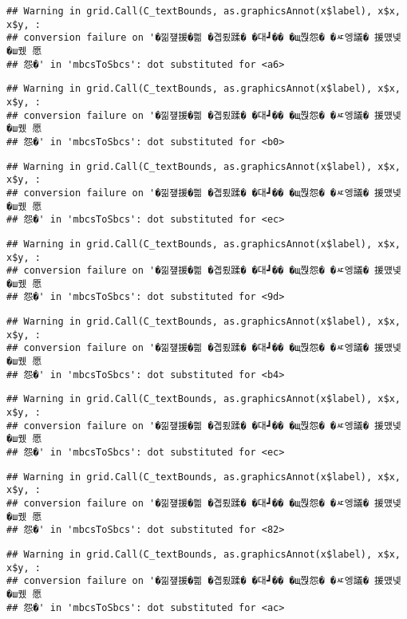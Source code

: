 \documentclass[
]{article}
\begin{document}
\begin{verbatim}
## Warning in grid.Call(C_textBounds, as.graphicsAnnot(x$label), x$x, x$y, :
## conversion failure on '�낆쟾援�쁾 �곕룄蹂� �대┛�� �щ쭩怨� �ㅼ엥議� 援먰넻�ш퀬 愿
## 怨�' in 'mbcsToSbcs': dot substituted for <a6>
\end{verbatim}

\begin{verbatim}
## Warning in grid.Call(C_textBounds, as.graphicsAnnot(x$label), x$x, x$y, :
## conversion failure on '�낆쟾援�쁾 �곕룄蹂� �대┛�� �щ쭩怨� �ㅼ엥議� 援먰넻�ш퀬 愿
## 怨�' in 'mbcsToSbcs': dot substituted for <b0>
\end{verbatim}

\begin{verbatim}
## Warning in grid.Call(C_textBounds, as.graphicsAnnot(x$label), x$x, x$y, :
## conversion failure on '�낆쟾援�쁾 �곕룄蹂� �대┛�� �щ쭩怨� �ㅼ엥議� 援먰넻�ш퀬 愿
## 怨�' in 'mbcsToSbcs': dot substituted for <ec>
\end{verbatim}

\begin{verbatim}
## Warning in grid.Call(C_textBounds, as.graphicsAnnot(x$label), x$x, x$y, :
## conversion failure on '�낆쟾援�쁾 �곕룄蹂� �대┛�� �щ쭩怨� �ㅼ엥議� 援먰넻�ш퀬 愿
## 怨�' in 'mbcsToSbcs': dot substituted for <9d>
\end{verbatim}

\begin{verbatim}
## Warning in grid.Call(C_textBounds, as.graphicsAnnot(x$label), x$x, x$y, :
## conversion failure on '�낆쟾援�쁾 �곕룄蹂� �대┛�� �щ쭩怨� �ㅼ엥議� 援먰넻�ш퀬 愿
## 怨�' in 'mbcsToSbcs': dot substituted for <b4>
\end{verbatim}

\begin{verbatim}
## Warning in grid.Call(C_textBounds, as.graphicsAnnot(x$label), x$x, x$y, :
## conversion failure on '�낆쟾援�쁾 �곕룄蹂� �대┛�� �щ쭩怨� �ㅼ엥議� 援먰넻�ш퀬 愿
## 怨�' in 'mbcsToSbcs': dot substituted for <ec>
\end{verbatim}

\begin{verbatim}
## Warning in grid.Call(C_textBounds, as.graphicsAnnot(x$label), x$x, x$y, :
## conversion failure on '�낆쟾援�쁾 �곕룄蹂� �대┛�� �щ쭩怨� �ㅼ엥議� 援먰넻�ш퀬 愿
## 怨�' in 'mbcsToSbcs': dot substituted for <82>
\end{verbatim}

\begin{verbatim}
## Warning in grid.Call(C_textBounds, as.graphicsAnnot(x$label), x$x, x$y, :
## conversion failure on '�낆쟾援�쁾 �곕룄蹂� �대┛�� �щ쭩怨� �ㅼ엥議� 援먰넻�ш퀬 愿
## 怨�' in 'mbcsToSbcs': dot substituted for <ac>
\end{verbatim}
\end{document}
